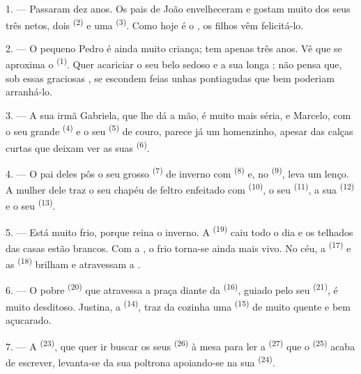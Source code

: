 1. --- Passaram dez anos. Os pais de João envelheceram e gostam muito
dos seus três netos, dois  \textsuperscript{(2)} e uma 
\textsuperscript{(3)}. Como hoje é o , os filhos vêm
felicitá-lo.

2. --- O pequeno Pedro é ainda muito criança; tem apenas três anos. Vê
que se aproxima o  \textsuperscript{(1)}. Quer acariciar o seu belo
 sedoso e a sua longa ; não pensa que, sob essas
graciosas , se escondem feias unhas pontiagudas que bem
poderiam arranhá-lo.

3. --- A sua irmã Gabriela, que lhe dá a mão, é muito mais séria, e
Marcelo, com o seu grande  \textsuperscript{(4)} e o seu
 \textsuperscript{(5)} de couro, parece já um homenzinho, apesar
das calças curtas que deixam ver as suas 
\textsuperscript{(6)}.

4. --- O pai deles pôs o seu grosso  \textsuperscript{(7)} de
inverno com  \textsuperscript{(8)} e, no 
\textsuperscript{(9)}, leva um lenço. A mulher dele traz o seu chapéu de feltro
enfeitado com  \textsuperscript{(10)}, o seu 
\textsuperscript{(11)}, a sua  \textsuperscript{(12)} e o seu
 \textsuperscript{(13)}.

5. --- Está muito frio, porque reina o inverno. A 
\textsuperscript{(19)} caiu todo o dia e os telhados das casas estão brancos.
Com a , o frio torna-se ainda mais vivo. No céu, a
 \textsuperscript{(17)} e as  \textsuperscript{(18)} brilham
e atravessam a .

\VUsaut{4.2mm}
\VUsaut{3.0mm}

6. --- O pobre  \textsuperscript{(20)} que atravessa a praça diante da
 \textsuperscript{(16)}, guiado pelo seu 
\textsuperscript{(21)}, é muito desditoso. Justina, a 
\textsuperscript{(14)}, traz da cozinha uma  \textsuperscript{(15)} de
 muito quente e bem açucarado.

7. --- A  \textsuperscript{(23)}, que quer ir buscar os seus
 \textsuperscript{(26)} à mesa para ler a 
\textsuperscript{(27)} que o  \textsuperscript{(25)} acaba de escrever,
levanta-se da sua poltrona apoiando-se na sua 
\textsuperscript{(24)}.

